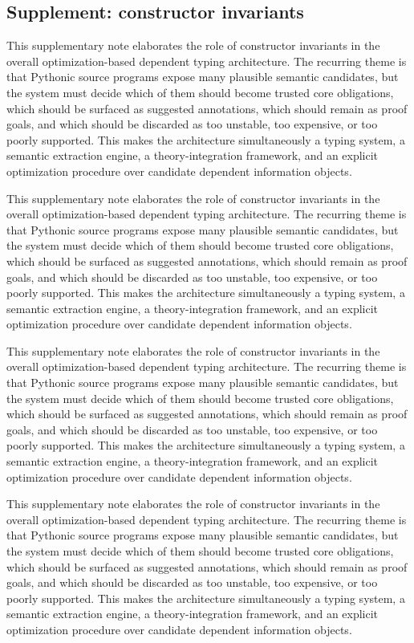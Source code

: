 \documentclass[11pt]{article}
\theoremstyle{definition}
\theoremstyle{plain}
\begin{document}
\subsection{Supplement: constructor invariants}
This supplementary note elaborates the role of constructor invariants in the overall
optimization-based dependent typing architecture. The recurring theme is that
Pythonic source programs expose many plausible semantic candidates, but the
system must decide which of them should become trusted core obligations, which
should be surfaced as suggested annotations, which should remain as proof
goals, and which should be discarded as too unstable, too expensive, or too
poorly supported. This makes the architecture simultaneously a typing system,
a semantic extraction engine, a theory-integration framework, and an explicit
optimization procedure over candidate dependent information objects.

This supplementary note elaborates the role of constructor invariants in the overall
optimization-based dependent typing architecture. The recurring theme is that
Pythonic source programs expose many plausible semantic candidates, but the
system must decide which of them should become trusted core obligations, which
should be surfaced as suggested annotations, which should remain as proof
goals, and which should be discarded as too unstable, too expensive, or too
poorly supported. This makes the architecture simultaneously a typing system,
a semantic extraction engine, a theory-integration framework, and an explicit
optimization procedure over candidate dependent information objects.

This supplementary note elaborates the role of constructor invariants in the overall
optimization-based dependent typing architecture. The recurring theme is that
Pythonic source programs expose many plausible semantic candidates, but the
system must decide which of them should become trusted core obligations, which
should be surfaced as suggested annotations, which should remain as proof
goals, and which should be discarded as too unstable, too expensive, or too
poorly supported. This makes the architecture simultaneously a typing system,
a semantic extraction engine, a theory-integration framework, and an explicit
optimization procedure over candidate dependent information objects.

This supplementary note elaborates the role of constructor invariants in the overall
optimization-based dependent typing architecture. The recurring theme is that
Pythonic source programs expose many plausible semantic candidates, but the
system must decide which of them should become trusted core obligations, which
should be surfaced as suggested annotations, which should remain as proof
goals, and which should be discarded as too unstable, too expensive, or too
poorly supported. This makes the architecture simultaneously a typing system,
a semantic extraction engine, a theory-integration framework, and an explicit
optimization procedure over candidate dependent information objects.
\end{document}
